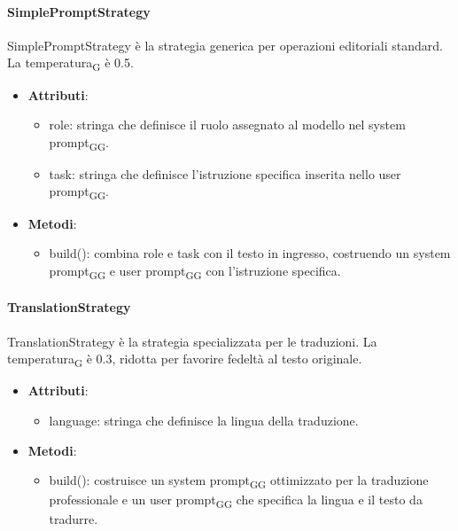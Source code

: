 \documentclass[11pt,a4paper]{article}
\newcommand{\gls}[1]{#1\textsubscript{G}}
\begin{document}
\paragraph{SimplePromptStrategy} 
SimplePromptStrategy è la strategia generica per operazioni editoriali standard. La \gls{temperatura} è 0.5.
\begin{itemize}

\item \textbf{Attributi}:

\begin{itemize}
\item role: stringa che definisce il ruolo assegnato al modello nel \gls{system \gls{prompt}}.
\item task: stringa che definisce l'istruzione specifica inserita nello \gls{user \gls{prompt}}.
\end{itemize}

\item \textbf{Metodi}: 

\begin{itemize}
\item build(): combina role e task con il testo in ingresso, costruendo un \gls{system \gls{prompt}} e \gls{user \gls{prompt}} con l'istruzione specifica.
\end{itemize}


\end{itemize}

\paragraph{TranslationStrategy} 
TranslationStrategy è la strategia specializzata per le traduzioni. La \gls{temperatura} è 0.3, ridotta per favorire fedeltà al testo originale.
\begin{itemize}

\item \textbf{Attributi}:

\begin{itemize}
\item language: stringa che definisce la lingua della traduzione.
\end{itemize}

\item \textbf{Metodi}: 

\begin{itemize}
\item build(): costruisce un \gls{system \gls{prompt}} ottimizzato per la traduzione professionale e un \gls{user \gls{prompt}} che specifica la lingua e il testo da tradurre.
\end{itemize}


\end{itemize}
\end{document}
